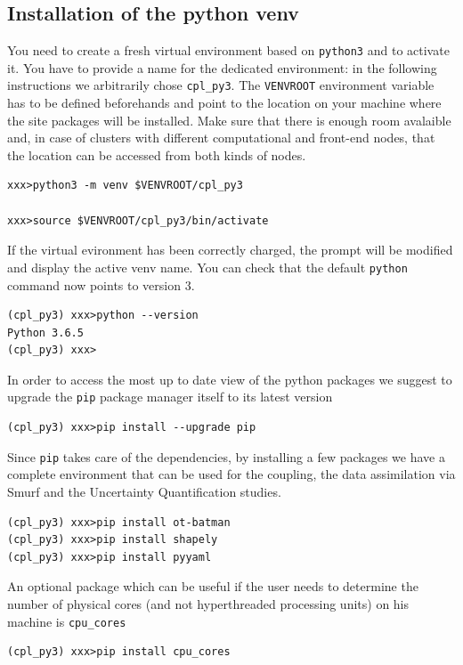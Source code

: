 \documentclass[Coupling]{../../data/TelemacDoc} %
\begin{document}


\begin{appendices}
  \chapter{Installation of the python venv}\label{ann:venv_install}

  You need to create a fresh virtual environment based on
  \texttt{python3} and to activate it.
  You have to provide a name for the dedicated
environment: in the following instructions we arbitrarily chose
\texttt{cpl\_py3}. The \texttt{VENVROOT} environment variable has to
be defined beforehands and point to the location on your machine where
the site packages will be installed. Make sure that there is enough
room avalaible and, in case of clusters with different
computational and front-end nodes, that the location can be accessed
from both kinds of nodes.
\begin{verbatim}
xxx>python3 -m venv $VENVROOT/cpl_py3

xxx>source $VENVROOT/cpl_py3/bin/activate
\end{verbatim}

If the virtual evironment has been correctly charged, the prompt will
be modified and display the active venv name. You can check that the
default \texttt{python} command now points to version 3.
\begin{verbatim}
(cpl_py3) xxx>python --version
Python 3.6.5
(cpl_py3) xxx>
\end{verbatim}

In order to access the most up to date view of the python packages we
suggest to upgrade the \texttt{pip} package manager itself to its latest
version
\begin{verbatim}
(cpl_py3) xxx>pip install --upgrade pip
\end{verbatim}

Since \texttt{pip} takes care of the dependencies, by installing a few
packages we have a complete environment that can be used for the
coupling, the data assimilation via Smurf and the Uncertainty
Quantification studies.
\begin{verbatim}
(cpl_py3) xxx>pip install ot-batman
(cpl_py3) xxx>pip install shapely
(cpl_py3) xxx>pip install pyyaml
\end{verbatim}

An optional package which can be useful if the user needs to determine
the number of physical cores (and not hyperthreaded processing units)
on his machine is \texttt{cpu\_cores}
\begin{verbatim}
(cpl_py3) xxx>pip install cpu_cores
\end{verbatim}


\end{appendices}
\end{document}
